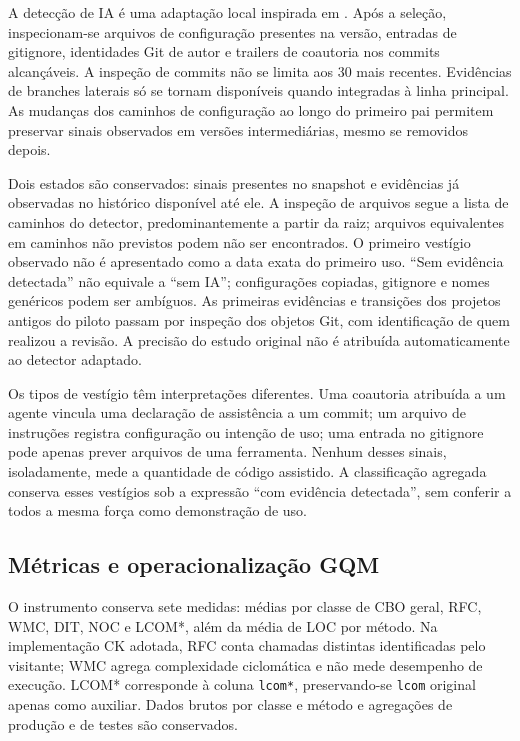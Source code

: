 A detecção de IA é uma adaptação local inspirada em \cite{robbes:26}. Após a seleção, inspecionam-se arquivos de configuração presentes na versão, entradas de gitignore, identidades Git de autor e trailers de coautoria nos commits alcançáveis. A inspeção de commits não se limita aos 30 mais recentes. Evidências de branches laterais só se tornam disponíveis quando integradas à linha principal. As mudanças dos caminhos de configuração ao longo do primeiro pai permitem preservar sinais observados em versões intermediárias, mesmo se removidos depois.

Dois estados são conservados: sinais presentes no snapshot e evidências já observadas no histórico disponível até ele. A inspeção de arquivos segue a lista de caminhos do detector, predominantemente a partir da raiz; arquivos equivalentes em caminhos não previstos podem não ser encontrados. O primeiro vestígio observado não é apresentado como a data exata do primeiro uso. ``Sem evidência detectada'' não equivale a ``sem IA''; configurações copiadas, gitignore e nomes genéricos podem ser ambíguos. As primeiras evidências e transições dos projetos antigos do piloto passam por inspeção dos objetos Git, com identificação de quem realizou a revisão. A precisão do estudo original não é atribuída automaticamente ao detector adaptado.

Os tipos de vestígio têm interpretações diferentes. Uma coautoria atribuída a um agente vincula uma declaração de assistência a um commit; um arquivo de instruções registra configuração ou intenção de uso; uma entrada no gitignore pode apenas prever arquivos de uma ferramenta. Nenhum desses sinais, isoladamente, mede a quantidade de código assistido. A classificação agregada conserva esses vestígios sob a expressão ``com evidência detectada'', sem conferir a todos a mesma força como demonstração de uso.

\subsection{Métricas e operacionalização GQM}
\label{subsec:metricas-avaliacao}

O instrumento conserva sete medidas: médias por classe de CBO geral, RFC, WMC, DIT, NOC e LCOM*, além da média de LOC por método. Na implementação CK adotada, RFC conta chamadas distintas identificadas pelo visitante; WMC agrega complexidade ciclomática e não mede desempenho de execução. LCOM* corresponde à coluna \texttt{lcom*}, preservando-se \texttt{lcom} original apenas como auxiliar. Dados brutos por classe e método e agregações de produção e de testes são conservados.

